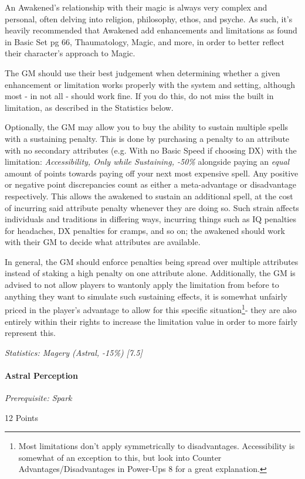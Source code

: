 \begin{multicols}{3}
	An Awakened's relationship with their magic is always very complex and personal, often delving into religion, philosophy, ethos, and psyche. As such, it's heavily recommended that Awakened add enhancements and limitations as found in Basic Set pg 66, Thaumatology, Magic, and more, in order to better reflect their character's approach to Magic.
	
	The GM should use their best judgement when determining whether a given enhancement or limitation works properly with the system and setting, although most - in not all - should work fine. If you do this, do not miss the built in limitation, as described in the Statistics below.
	
	Optionally, the GM may allow you to buy the ability to sustain multiple spells with a sustaining penalty. This is done by purchasing a penalty to an attribute with no secondary attributes (e.g. With no Basic Speed if choosing DX) with the limitation: \textit{Accessibility, Only while Sustaining, -50\%} alongside paying an \textit{equal} amount of points towards paying off your next most expensive spell. Any positive or negative point discrepancies count as either a meta-advantage or disadvantage respectively. This allows the awakened to sustain an additional spell, at the cost of incurring said attribute penalty whenever they are doing so. Such strain affects individuals and traditions in differing ways, incurring things such as IQ penalties for headaches, DX penalties for cramps, and so on; the awakened should work with their GM to decide what attributes are available. 
	
	In general, the GM should enforce penalties being spread over multiple attributes instead of staking a high penalty on one attribute alone. Additionally, the GM is advised to not allow players to wantonly apply the limitation from before to anything they want to simulate such sustaining effects, it is somewhat unfairly priced in the player's advantage to allow for this specific situation\footnote{Most limitations don't apply symmetrically to disadvantages. Accessibility is somewhat of an exception to this, but look into Counter Advantages/Disadvantages in Power-Ups 8 for a great explanation.}- they are also entirely within their rights to increase the limitation value in order to more fairly represent this.
	
	\textit{\textcolor{OliveGreen}{Statistics: Magery (Astral, -15\%) [7.5]}}
	
	\paragraph{Astral Perception}\label{astral_perception}
	\textit{Prerequisite: Spark}
	\begin{flushright}
		12 Points
	\end{flushright}
	

\end{multicols}
